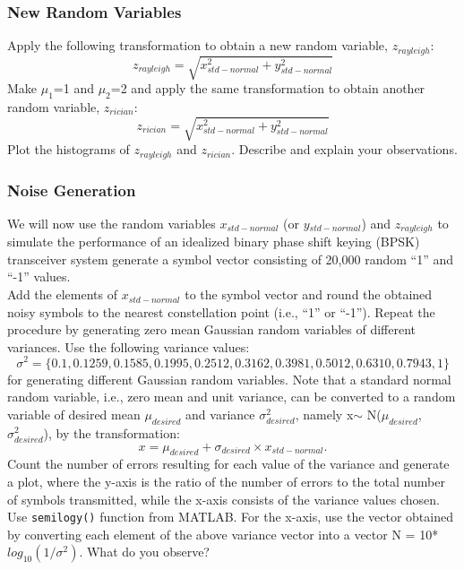 \documentclass[letterpaper,12pt]{article}
\begin{document}
\subsubsection{New Random Variables}
\label{sec:newrv}
Apply the following transformation to obtain a new random variable, $z_{rayleigh}$:
\begin{equation}
z_{rayleigh}=\sqrt{x_{std-normal}^2+y_{std-normal}^2}
\end{equation}
Make $\mu_1$=1 and $\mu_2$=2 and apply the same transformation to obtain another random variable, $z_{rician}$:
\begin{equation}
z_{rician}=\sqrt{x_{std-normal}^2+y_{std-normal}^2}
\end{equation}
Plot the histograms of $z_{rayleigh}$ and $z_{rician}$. Describe and explain your observations.

\subsubsection{Noise Generation}
We will now use the random variables $x$$_{std-normal}$ (or $y$$_{std-normal}$) and
$z_{rayleigh}$ to simulate the performance of an idealized binary phase shift keying (BPSK) transceiver system generate a symbol vector consisting of 20,000 random ``1'' and ``-1'' values.\\

 Add the elements of $x_{std-normal}$ to the symbol vector and round the obtained noisy
symbols to the nearest constellation point (i.e., ``1'' or ``-1''). Repeat the procedure by
generating zero mean Gaussian random variables of different variances. Use the
following variance values:
\begin{equation}
\sigma^2=\{0.1, 0.1259, 0.1585, 0.1995, 0.2512, 0.3162, 0.3981, 0.5012, 0.6310, 0.7943, 1\}
\end{equation}
for generating different Gaussian random variables. Note that a standard normal random
variable, i.e., zero mean and unit variance, can be converted to a random variable of
desired mean $\mu_{desired}$ and variance $\sigma^2_{desired}$, namely x$\sim$ N($\mu_{desired}$, $\sigma^2_{desired}$), by the
transformation:
\begin{equation}
x=\mu_{desired}+\sigma_{desired}\times x_{std-normal}.
\end{equation}
Count the number of errors resulting for each value of the variance and generate a plot,
where the y-axis is the ratio of the number of errors to the total number of symbols
transmitted, while the x-axis consists of the variance values chosen. Use \texttt{semilogy()}
function from MATLAB. For the x-axis, use the vector obtained by converting each
element of the above variance vector into a vector N = 10*$log_{10}(1/\sigma^2)$. What do you observe?\\
\end{document}
